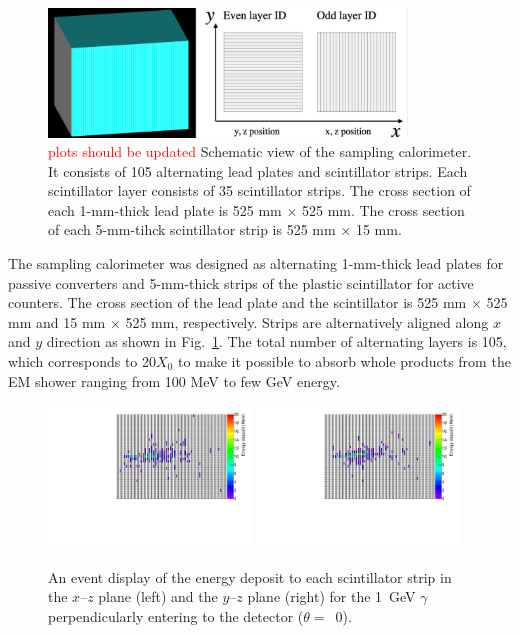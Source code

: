 \documentclass[jkps,preprint,fleqn,showpacs,showkeys]{revtex4}
\begin{document}
\begin{figure}[!hbt]
\includegraphics[width=0.85\textwidth]{figures/Sec2/Prototype_samplingcal.pdf}
\caption{ \textcolor{red}{plots should be updated} Schematic view of the sampling calorimeter. It consists of 105 alternating lead plates and scintillator strips. Each scintillator layer consists of 35 scintillator strips. The cross section of each 1-mm-thick lead plate is 525 mm $\times$ 525 mm. The cross section of each 5-mm-tihck scintillator strip is 525 mm $\times$ 15 mm. }
\label{fig:det_conf}
\end{figure}

The sampling calorimeter was designed as alternating 1-mm-thick lead plates for passive converters and 5-mm-thick strips of the plastic scintillator for active counters. The cross section of the lead plate and the scintillator is 525 mm $\times$ 525 mm and 15 mm $\times$ 525 mm, respectively. Strips are alternatively aligned along $x$ and $y$ direction as shown in Fig.~\ref{fig:det_conf}. The total number of alternating layers is 105, which corresponds to 20$X_{0}$ to make it possible to absorb whole products from the EM shower ranging from 100 MeV to few GeV energy.

\begin{figure}[!hbt]
\includegraphics[width=0.48\textwidth]{figures/SingleEventXZHit.pdf}
\includegraphics[width=0.48\textwidth]{figures/SingleEventYZHit.pdf}
\caption{ An event display of the energy deposit to each scintillator strip in the $x$--$z$ plane (left) and the $y$--$z$ plane (right) for the 1~GeV $\gamma$ perpendicularly entering to the detector ($\theta=$~0).}
\label{fig:Evt_Dis}
\end{figure}
\end{document}
